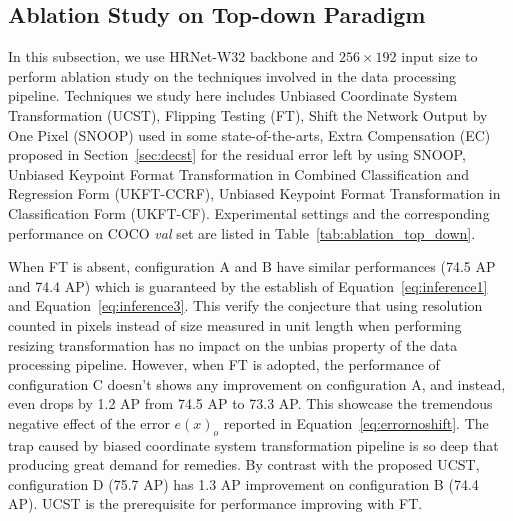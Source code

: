 \documentclass[10pt,journal,compsoc]{IEEEtran}
\begin{document}
\subsection{Ablation Study on Top-down Paradigm}
In this subsection, we use HRNet-W32 backbone and $256\times192$ input size to perform ablation study on the techniques involved in the data processing pipeline. Techniques we study here includes Unbiased Coordinate System Transformation (UCST), Flipping Testing (FT), Shift the Network Output by One Pixel (SNOOP) used in some state-of-the-arts\cite{SBNet,HRNet,DARK}, Extra Compensation (EC) proposed in Section~\ref{sec:decst} for the residual error left by using SNOOP, Unbiased Keypoint Format Transformation in Combined Classification and Regression Form (UKFT-CCRF), Unbiased Keypoint Format Transformation in Classification Form (UKFT-CF). Experimental settings and the corresponding performance on COCO \textit{val} set are listed in Table~\ref{tab:ablation_top_down}.

When FT is absent, configuration A and B have similar performances (74.5 AP and 74.4 AP) which is guaranteed by the establish of Equation~\ref{eq:inference1} and Equation~\ref{eq:inference3}. This verify the conjecture that using resolution counted in pixels instead of size measured in unit length when performing resizing transformation has no impact on the unbias property of the data processing pipeline. However, when FT is adopted, the performance of configuration C doesn't shows any improvement on configuration A, and instead, even drops by 1.2 AP from 74.5 AP to 73.3 AP. This showcase the tremendous negative effect of the error $e(x)_o$ reported in Equation~\ref{eq:errornoshift}. The trap caused by biased coordinate system transformation pipeline is so deep that producing great demand for remedies. By contrast with the proposed UCST, configuration D (75.7 AP) has 1.3 AP improvement on configuration B (74.4 AP). UCST is the prerequisite for performance improving with FT.
\end{document}
